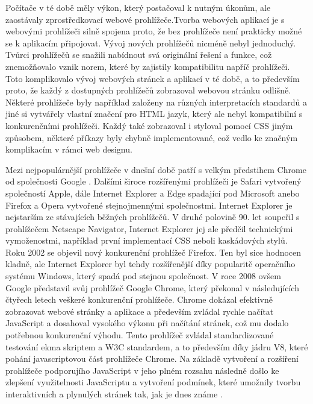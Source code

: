 Počítače v té době měly výkon, který postačoval k nutným úkonům, ale zaostávaly zprostředkovací webové prohlížeče.Tvorba webových aplikací je s webovými prohlížeči silně spojena proto, že bez prohlížeče není prakticky možné se k aplikacím připojovat. Vývoj nových prohlížečů nicméně nebyl jednoduchý. Tvůrci prohlížečů se snažili nabídnout svá originální řešení a funkce, což znemožňovalo vznik norem, které by zajistily kompatibilitu napříč prohlížeči. Toto komplikovalo vývoj webových stránek a aplikací v té době, a to především proto, že každý z dostupných prohlížečů zobrazoval webovou stránku odlišně. Některé prohlížeče byly například založeny na různých interpretacích standardů a jiné si vytvářely vlastní značení pro HTML jazyk, který ale nebyl kompatibilní s konkurenčními prohlížeči. Každý také zobrazoval i styloval pomocí CSS jiným způsobem, některé příkazy byly chybně implementované, což vedlo ke značným komplikacím v rámci web designu.

Mezi nejpopulárnější prohlížeče v dnešní době patří s velkým předstihem Chrome od společnosti Google \cite{chrome}. Dalšími široce rozšířenými prohlížeči je Safari vytvořený společností Apple, dále Internet Explorer a Edge spadající pod Microsoft anebo Firefox a Opera vytvořené stejnojmennými společnostmi. Internet Explorer je nejstarším ze stávajících běžných prohlížečů. V druhé polovině 90. let soupeřil s prohlížečem Netscape Navigator, Internet Explorer jej ale předčil technickými vymoženostmi, například první implementací CSS neboli kaskádových stylů. Roku 2002 se objevil nový konkurenční prohlížeč Firefox. Ten byl sice hodnocen kladně, ale Internet Explorer byl tehdy rozšířenější díky popularitě operačního systému Windows, který spadá pod stejnou společnost. V roce 2008 ovšem Google představil svůj prohlížeč Google Chrome, který překonal v následujících čtyřech letech veškeré konkurenční prohlížeče. Chrome dokázal efektivně zobrazovat webové stránky a aplikace a především zvládal rychle načítat JavaScript a dosahoval vysokého výkonu při načítání stránek, což mu dodalo potřebnou konkurenční výhodu. Tento prohlížeč zvládal standardizované testování ekma skriptem a W3C standardem, a to především díky jádru V8, které pohání javascriptovou část prohlížeče Chrome. Na základě vytvoření a rozšíření prohlížeče podporujího JavaScript v jeho plném rozsahu následně došlo ke zlepšení využitelnosti JavaScriptu a vytvoření podmínek, které umožnily tvorbu interaktivních a plynulých stránek tak, jak je dnes známe \cite{futureofsoftware}.

